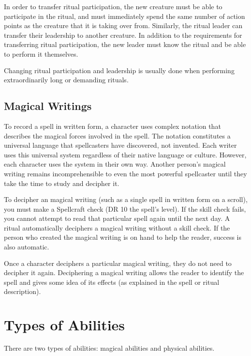             In order to transfer ritual participation, the new creature must be able to participate in the ritual, and must immediately spend the same number of action points as the creature that it is taking over from.
            Similarly, the ritual leader can transfer their leadership to another creature.
            In addition to the requirements for transferring ritual participation, the new leader must know the ritual and be able to perform it themselves.

            Changing ritual participation and leadership is usually done when performing extraordinarily long or demanding rituals.

    \subsection{Magical Writings}
        To record a spell in written form, a character uses complex notation that describes the magical forces involved in the spell.
        The notation constitutes a universal language that spellcasters have discovered, not invented.
        Each writer uses this universal system regardless of their native language or culture.
        However, each character uses the system in their own way.
        Another person's magical writing remains incomprehensible to even the most powerful spellcaster until they take the time to study and decipher it.

        To decipher an magical writing (such as a single spell in written form on a scroll), you must make a Spellcraft check (DR 10 \add the spell's level). If the skill check fails, you cannot attempt to read that particular spell again until the next day.
        A  ritual automatically deciphers a magical writing without a skill check.
        If the person who created the magical writing is on hand to help the reader, success is also automatic.

        Once a character deciphers a particular magical writing, they do not need to decipher it again.
        Deciphering a magical writing allows the reader to identify the spell and gives some idea of its effects (as explained in the spell or ritual description).

\section{Types of Abilities}

    There are two types of abilities: magical abilities and physical abilities.

